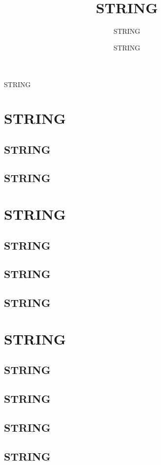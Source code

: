 \documentclass[15pt,a4paper]{article}
\author{STRING}
\title{STRING}
\date{STRING}
\begin{document}
\maketitle
STRING
\section{STRING}
\subsection{STRING}
\subsection{STRING}
\section{STRING}
\subsection{STRING}
\subsection{STRING}
\subsection{STRING}
\section{STRING}
\subsection{STRING}
\subsection{STRING}
\subsection{STRING}
\subsection{STRING}
\end{document}

